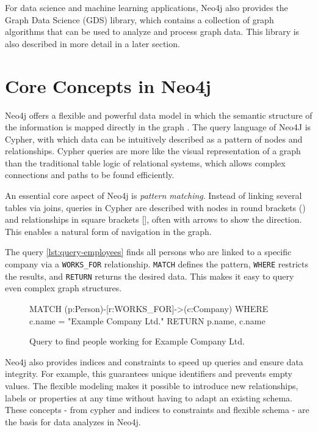 \documentclass[english,smartquotes,apa]{hgbreport}
\begin{document}
\bigskip
\noindent
For data science and machine learning applications, Neo4j also provides the Graph Data Science (GDS) library, which contains a collection of graph algorithms that can be used to analyze and process graph data. This library is also described in more detail in a later section.


\section*{Core Concepts in Neo4j}

Neo4j offers a flexible and powerful data model in which the semantic structure of the information is mapped directly in the graph \parencite{robinson2015graph}. The query language of Neo4J is Cypher, with which data can be intuitively described as a pattern of nodes and relationships. Cypher queries are more like the visual representation of a graph than the traditional table logic of relational systems, which allows complex connections and paths to be found efficiently.

An essential core aspect of Neo4j is \emph{pattern matching}. Instead of linking several tables via joins, queries in Cypher are described with nodes in round brackets () and relationships in square brackets [], often with arrows to show the direction. This enables a natural form of navigation in the graph. 

The query \autoref{lst:query-employees} finds all persons who are linked to a specific company via a \lstinline{WORKS_FOR} relationship. \lstinline{MATCH} defines the pattern, \lstinline{WHERE} restricts the results, and \lstinline{RETURN} returns the desired data. This makes it easy to query even complex graph structures.

\begin{figure}[h]
	\begin{GenericCode}[numbers=none]
	MATCH (p:Person)-[r:WORKS_FOR]->(c:Company)
	WHERE c.name = "Example Company Ltd."
	RETURN p.name, c.name
	\end{GenericCode}
	\caption{Query to find people working for Example Company Ltd.}
	\label{lst:query-employees}
\end{figure}

Neo4j also provides indices and constraints to speed up queries and ensure data integrity. For example, this guarantees unique identifiers and prevents empty values. The flexible modeling makes it possible to introduce new relationships, labels or properties at any time without having to adapt an existing schema. These concepts - from cypher and indices to constraints and flexible schema - are the basis for data analyzes in Neo4j.
\end{document}
